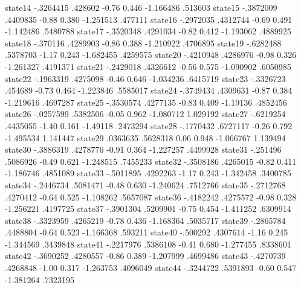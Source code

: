      state14 {\VBAR}  -.3264415    .428602    -0.76   0.446    -1.166486     .513603
     state15 {\VBAR}  -.3872009   .4409835    -0.88   0.380    -1.251513     .477111
     state16 {\VBAR}  -.2972035   .4312744    -0.69   0.491    -1.142486    .5480788
     state17 {\VBAR}  -.3520348   .4291034    -0.82   0.412    -1.193062    .4889925
     state18 {\VBAR}   -.370116   .4289903    -0.86   0.388    -1.210922    .4706895
     state19 {\VBAR}  -.6282488   .5378703    -1.17   0.243    -1.682455    .4259575
     state20 {\VBAR}  -.4210948   .4286976    -0.98   0.326    -1.261327    .4191371
     state21 {\VBAR}  -.2429018   .4326612    -0.56   0.575    -1.090902    .6050985
     state22 {\VBAR}  -.1963319   .4275098    -0.46   0.646    -1.034236    .6415719
     state23 {\VBAR}  -.3326723    .454689    -0.73   0.464    -1.223846    .5585017
     state24 {\VBAR}  -.3749434   .4309631    -0.87   0.384    -1.219616    .4697287
     state25 {\VBAR}  -.3530574   .4277135    -0.83   0.409     -1.19136    .4852456
     state26 {\VBAR}  -.0257599   .5382506    -0.05   0.962    -1.080712    1.029192
     state27 {\VBAR}  -.6219254   .4435055    -1.40   0.161     -1.49118    .2473294
     state28 {\VBAR}  -.1770432   .6727117    -0.26   0.792    -1.495534    1.141447
     state29 {\VBAR}   .0363635   .5628318     0.06   0.948    -1.066767    1.139494
     state30 {\VBAR}  -.3886319   .4278776    -0.91   0.364    -1.227257    .4499928
     state31 {\VBAR}   -.251496   .5086926    -0.49   0.621    -1.248515    .7455233
     state32 {\VBAR}  -.3508186   .4265015    -0.82   0.411    -1.186746    .4851089
     state33 {\VBAR}  -.5011895   .4292263    -1.17   0.243    -1.342458    .3400785
     state34 {\VBAR}  -.2446734   .5081471    -0.48   0.630    -1.240624    .7512766
     state35 {\VBAR}  -.2712768   .4270412    -0.64   0.525    -1.108262    .5657087
     state36 {\VBAR}  -.4182242   .4275572    -0.98   0.328    -1.256221    .4197725
     state37 {\VBAR}  -.3901304   .5209901    -0.75   0.454    -1.411252    .6309914
     state38 {\VBAR}  -.3323959   .4265219    -0.78   0.436    -1.168364    .5035717
     state39 {\VBAR}  -.2865784   .4488804    -0.64   0.523    -1.166368     .593211
     state40 {\VBAR}   -.500292   .4307614    -1.16   0.245    -1.344569    .3439848
     state41 {\VBAR}  -.2217976   .5386108    -0.41   0.680    -1.277455    .8338601
     state42 {\VBAR}  -.3690252   .4280557    -0.86   0.389    -1.207999    .4699486
     state43 {\VBAR}  -.4270739   .4268848    -1.00   0.317    -1.263753    .4096049
     state44 {\VBAR}  -.3244722   .5391893    -0.60   0.547    -1.381264    .7323195
